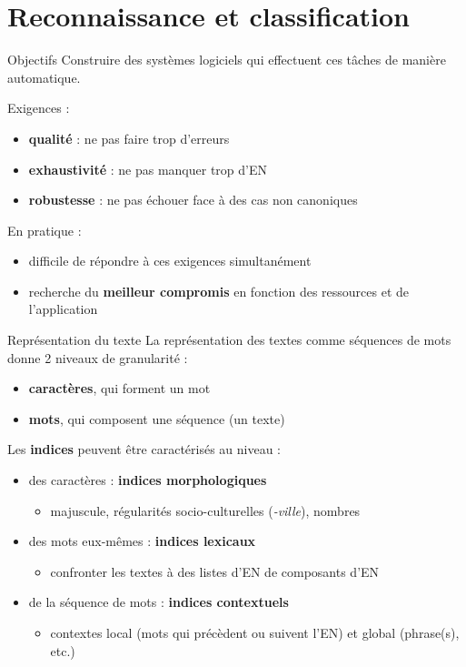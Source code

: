 \documentclass[xetex,xcolor={table,usenames,dvipsnames}]{beamer}
\newcommand{\bolder}[1]{{\color{purple}\bfseries#1}}
\begin{document}
\section{Reconnaissance et classification}
\begin{frame}{Objectifs}
	Construire des systèmes logiciels qui effectuent ces tâches de manière automatique.
	
	Exigences : 
	\begin{itemize}
		\item \bolder{qualité} : ne pas faire trop d'erreurs
		\item \bolder{exhaustivité} : ne pas manquer trop d'\textsc{EN}
		\item \bolder{robustesse} : ne pas échouer face à des cas non canoniques
	\end{itemize}
	
	En pratique : 
	\begin{itemize}
		\item difficile de répondre à ces exigences simultanément
		\item recherche du \textcolor{deepblue}{\textbf{meilleur compromis}} en fonction des ressources et de l'application
	\end{itemize}
\end{frame}

\begin{frame}{Représentation du texte}
	La représentation des textes comme séquences de mots donne 2 niveaux de granularité : 
	\begin{itemize}
		\item \textbf{caractères}, qui forment un mot
		\item \textbf{mots}, qui composent une séquence (un texte)
	\end{itemize}
	
	Les \bolder{indices} peuvent être caractérisés au niveau : \begin{itemize}
		\item des caractères : \textcolor{deepblue}{\textbf{indices morphologiques}}
		\begin{itemize}
			\item majuscule, régularités socio-culturelles (\textit{-ville}), nombres
		\end{itemize}
		\item des mots eux-mêmes : \textcolor{deepblue}{\textbf{indices lexicaux}}
				\begin{itemize}
			\item confronter les textes à des listes d'\textsc{EN} de composants d'\textsc{EN}
		\end{itemize}
		\item de la séquence de mots : \textcolor{deepblue}{\textbf{indices contextuels}}
				\begin{itemize}
			\item contextes local (mots qui précèdent ou suivent l'\textsc{EN}) et global (phrase(s), etc.)
		\end{itemize}
	\end{itemize}
\end{frame}
\end{document}
